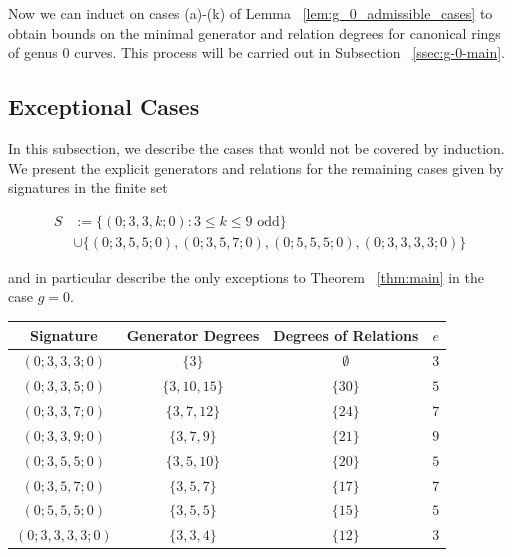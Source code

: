 \documentclass{amsart}
\theoremstyle{plain}
\theoremstyle{definition}
\theoremstyle{remark}
\numberwithin{equation}{section}
\newcommand\ssec{\subsection}
\newcommand \sx{\mathscr X}
\begin{document}
Now we can induct on cases (a)-(k) of Lemma ~\ref{lem:g_0_admissible_cases}
to obtain bounds on the minimal generator and relation degrees for
canonical rings of genus 0 curves. This process will be carried out in Subsection ~\ref{ssec:g-0-main}.




\ssec{Exceptional Cases}
\label{ssec:g-0-exceptional}
In this subsection, we describe the cases that would not be covered by induction.
We present the explicit generators and relations for the remaining
cases given by signatures in the finite set

\begin{align*}
	S &:= \{(0; 3, 3, k; 0) : 3 \leq k \leq 9 \text{ odd}\} \\
		&\cup \{(0; 3, 5, 5; 0) ,(0; 3, 5, 7; 0), (0; 5, 5, 5; 0), (0; 3, 3, 3, 3; 0)\}
\end{align*}

\noindent
and in particular describe the only exceptions to Theorem ~\ref{thm:main}
in the case $g = 0$.

\begin{longtable}
	{| c || c | c | c |}
	\hline
	Signature & Generator Degrees & Degrees of Relations & $e$ \\
	\hline
	\hline

	$(0; 3, 3, 3; 0)$ & $\{3\}$ & $\emptyset$ & $3$ \\	\hline

	$(0; 3, 3, 5; 0)$ & $\{3, 10, 15\}$ & $\{30\}$ & $5$ \\	\hline
	
	$(0; 3, 3, 7; 0)$ & $\{3, 7, 12\}$ & $\{24\}$ & $7$ \\	\hline
	
	$(0; 3, 3, 9; 0)$ & $\{3, 7, 9\}$ & $\{21\}$ & $9$ \\	\hline
	
	$(0; 3, 5, 5; 0)$ & $\{3, 5, 10\}$ & $\{20\}$ & $5$ \\	\hline
	
	$(0; 3, 5, 7; 0)$ & $\{3, 5, 7\}$ & $\{17\}$ & $7$ \\	\hline
	
	$(0; 5, 5, 5; 0)$ & $\{3, 5, 5\}$ & $\{15\}$ & $5$ \\	\hline
	
	$(0; 3, 3, 3, 3; 0)$ & $\{3, 3, 4\}$ & $\{12\}$ & $3$ \\	\hline
\end{longtable}
\end{document}
